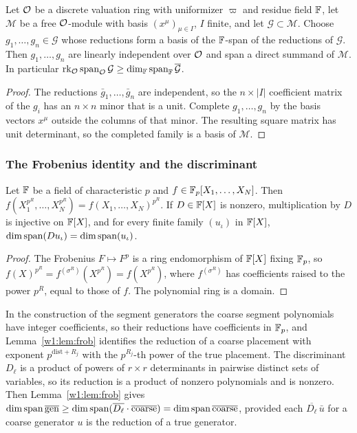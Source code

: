 \begin{lemma}\label{w1:lem:nakayama}
Let $\mathcal O$ be a discrete valuation ring with uniformizer $\varpi$ and residue field $\mathbb F$, let $\mathcal M$ be a free $\mathcal O$-module with basis $(x^\mu)_{\mu\in I}$, $I$ finite, and let $\mathcal G\subset\mathcal M$. Choose $g_1,\dots,g_n\in\mathcal G$ whose reductions form a basis of the $\mathbb F$-span of the reductions of $\mathcal G$. Then $g_1,\dots,g_n$ are linearly independent over $\mathcal O$ and span a direct summand of $\mathcal M$. In particular $\operatorname{rk}_\mathcal O\operatorname{span}_\mathcal O\mathcal G\ge\dim_\mathbb F\operatorname{span}_\mathbb F\overline{\mathcal G}$.
\end{lemma}

\begin{proof}
The reductions $\bar g_1,\dots,\bar g_n$ are independent, so the $n\times\lvert I\rvert$ coefficient matrix of the $g_i$ has an $n\times n$ minor that is a unit. Complete $g_1,\dots,g_n$ by the basis vectors $x^\mu$ outside the columns of that minor. The resulting square matrix has unit determinant, so the completed family is a basis of $\mathcal M$.
\end{proof}

\subsubsection{The Frobenius identity and the discriminant}

\begin{lemma}\label{w1:lem:frob}
Let $\mathbb F$ be a field of characteristic $p$ and $f\in\mathbb F_p[X_1,\dots,X_N]$. Then $f(X_1^{p^R},\dots,X_N^{p^R})=f(X_1,\dots,X_N)^{p^R}$. If $D\in\mathbb F[X]$ is nonzero, multiplication by $D$ is injective on $\mathbb F[X]$, and for every finite family $(u_\iota)$ in $\mathbb F[X]$, $\dim\operatorname{span}(Du_\iota)=\dim\operatorname{span}(u_\iota)$.
\end{lemma}

\begin{proof}
The Frobenius $F\mapsto F^p$ is a ring endomorphism of $\mathbb F[X]$ fixing $\mathbb F_p$, so $f(X)^{p^R}=f^{(\sigma^R)}(X^{p^R})=f(X^{p^R})$, where $f^{(\sigma^R)}$ has coefficients raised to the power $p^R$, equal to those of $f$. The polynomial ring is a domain.
\end{proof}

In the construction of the segment generators the coarse segment polynomials have integer coefficients, so their reductions have coefficients in $\mathbb F_p$, and Lemma~\ref{w1:lem:frob} identifies the reduction of a coarse placement with exponent $p^{\mathrm{dist}+R_j}$ with the $p^{R_j}$-th power of the true placement. The discriminant $D_\ell$ is a product of powers of $r\times r$ determinants in pairwise distinct sets of variables, so its reduction is a product of nonzero polynomials and is nonzero. Then Lemma~\ref{w1:lem:frob} gives $\dim\operatorname{span}\overline{\mathrm{gen}}\ge\dim\operatorname{span}(\overline{D_\ell}\cdot\overline{\mathrm{coarse}})=\dim\operatorname{span}\overline{\mathrm{coarse}}$, provided each $\overline{D_\ell}\,\bar u$ for a coarse generator $u$ is the reduction of a true generator.

